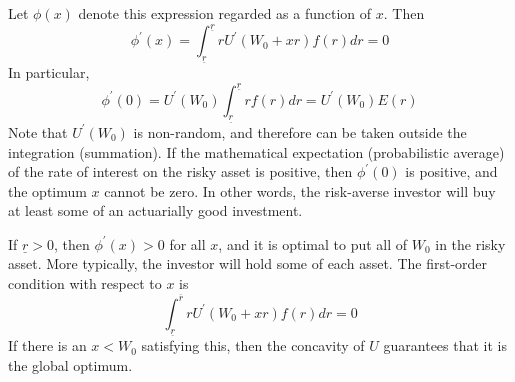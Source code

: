 Let $\phi(x)$ denote this expression regarded as a function of $x$. Then
\begin{equation*}
\phi^\prime(x) = \int_{\underline{r}}^{\underline{r}} r U^\prime (W_0+xr) f(r) dr=0
\end{equation*}
In particular,
\begin{equation*}
\phi^\prime(0) = U^\prime(W_0) \int_{\underline{r}}^{\underline{r}} r f(r) dr = U^\prime (W_0) E(r)
\end{equation*}
Note that $U^\prime(W_0)$ is non-random, and therefore can be taken outside the integration (summation). If the mathematical expectation (probabilistic average) of the rate of interest on the risky asset is positive, then $\phi^\prime(0)$ is positive, and the optimum $x$ cannot be zero. In other words, the risk-averse investor will buy at least some of an actuarially good investment.

If $\underline{r} >0$, then $\phi^\prime(x)>0$ for all $x$, and it is optimal to put all of $W_0$ in the risky asset. More typically, the investor will hold some of each asset. The first-order condition with respect to $x$ is
\begin{equation} \label{equa9.8}
\int_{\underline{r}}^{\overline{r}} r U^\prime (W_0+xr) f(r)dr =0
\end{equation}
If there is an $x<W_0$ satisfying this, then the concavity of $U$ guarantees that it is the global optimum.


